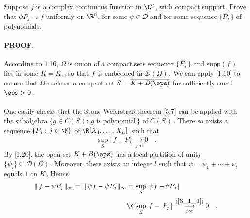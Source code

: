 {\CMUCS Suppose $f$ is a complex continuous function in $\R^n$, with compact support. \!\!Prove that $\psi P_j\to \!f$ uniformly on $\R^n$, for some $\psi\in \mathscr{D}$ and for some sequence $\{P_j\,\}$ of polynomials.}
\paragraph{PROOF.} According to 1.16, $\Omega$ is union of a compact sets sequence $\{K_{i\,}\}$ and $\text{supp} (f\,)$ lies in some $K= K_{i\,}$, so that $f\,$ is embedded in $\mathscr{D}(\Omega)\,$. We can apply [1.10] to ensure that $\Omega$ encloses a compact set $S=\overline{K +B(\eps)}$ for sufficiently small $\eps>0\,$.\\
\\
One easily checks that the Stone-Weierstraß theorem [5.7] can be applied with the subalgebra $ \{ g\in C(S\,) :\, g \text{ is polynomial}\,\}$ of $C(S\,)\,$.
There so exists a sequence $\{P_j:\, j\in \N\}$ of $\R[X_1,\dotsc,\, X_n]\,$ such that 
\begin{align}\label{6_1_1}
\sup_S \lvert\, f-P_{j\,} \rvert  \underset{j\infty}{\longrightarrow} 0\quad.
\end{align} 
 By [6.20], the open set $K +B(\eps)$ has a local partition of unity $\{\psi_i\}\subseteq \mathscr{D}(\Omega)\,$. Moreover, there exists an integer $l$ such that $\psi=\psi_1+\dotsb+\psi_l\,$ equals $1$ on $K\,$. Hence
\begin{align}\label{6_1_2}
\| \, f - \psi P_{j\,}\|_\infty=  \, \|  \,\psi f - \psi P_{j\,}\|_\infty 
=  &  \, \sup_S  \lvert \, \psi f -\! \psi P_{j\,}\rvert  \\
   \<  &  \,   \sup_S  \lvert  \, f -  \, P_{j\,} \rvert    \, \overset{(\ref{6_1_1})}{\underset{j\infty}{\longrightarrow}} 0\quad .
\end{align} 
\QED
